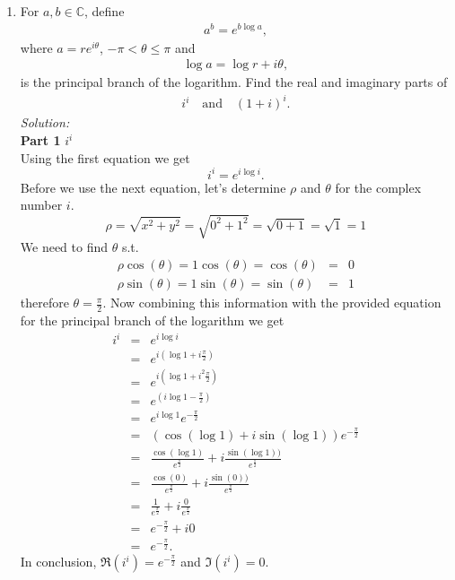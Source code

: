 \documentclass[10pt]{amsart}
\theoremstyle{nonumberplain}
\begin{document}
\begin{enumerate}[label={\bf {\arabic*}:}]
\item For $a, b \in \mathbb C$, define
  \begin{align*}
    a^b = e^{b \log a},
  \end{align*}
  where $a = r e^{i \theta}$, $- \pi < \theta \leq \pi$ and
  \begin{align*}
    \log a = \log r + i \theta,
  \end{align*}
  is the principal branch of the logarithm.  Find the real and
  imaginary parts of
  \begin{align*}
    i^i \quad \text{and} \quad (1 + i)^i.
  \end{align*}
\textit{Solution:} \\
\textbf{Part 1}  $i^i$ \\
Using the first equation we get
$$i^i = e^{i\log{i}}.$$
Before we use the next equation, let's determine $\rho$ and $\theta$ for the complex number $i$.
$$\rho = \sqrt{x^2 + y^2} = \sqrt{0^2 + 1^2} = \sqrt{0 + 1} = \sqrt{1} = 1$$
We need to find $\theta$ s.t.
\begin{eqnarray*}
\rho \cos(\theta) = 1 \cos(\theta) = \cos(\theta) &=& 0 \\
\rho \sin(\theta) = 1 \sin(\theta) = \sin(\theta)  &=& 1
\end{eqnarray*}
therefore $\theta = \frac{\pi}{2}$.
Now combining this information with the provided equation for the principal branch of the logarithm we get
\begin{eqnarray*}
i^i &=& e^{i\log{i}} \\
    &=& e^{i(\log{1}+i\frac{\pi}{2})} \\
    &=& e^{i(\log{1}+i^2\frac{\pi}{2})} \\
    &=& e^{(i\log{1}-\frac{\pi}{2})} \\
    &=& e^{i\log{1}}e^{-\frac{\pi}{2}} \\
    &=& (\cos(\log{1}) + i\sin(\log{1}))e^{-\frac{\pi}{2}} \\
    &=& \frac{\cos(\log{1})}{e^{\frac{\pi}{2}}} + i\frac{\sin(\log{1}))}{e^{\frac{\pi}{2}}} \\
    &=& \frac{\cos(0)}{e^{\frac{\pi}{2}}} + i\frac{\sin(0))}{e^{\frac{\pi}{2}}} \\
    &=& \frac{1}{e^{\frac{\pi}{2}}} + i\frac{0}{e^{\frac{\pi}{2}}} \\
    &=& e^{-\frac{\pi}{2}} + i0 \\
    &=& e^{-\frac{\pi}{2}}.
\end{eqnarray*}
In conclusion, $\Re{(i^i)} = e^{-\frac{\pi}{2}}$ and $\Im{(i^i)} = 0$. \\

\end{enumerate}
\end{document}
